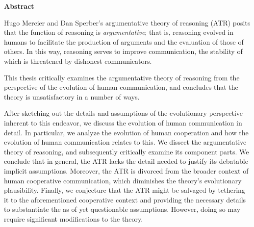 \thispagestyle{empty}
\begin{center}
    \large \textbf{Abstract}
\end{center}

\noindent Hugo Mercier and Dan Sperber's argumentative theory of reasoning (ATR) posits that the function of reasoning is \emph{argumentative}; that is, reasoning evolved in humans to facilitate the production of arguments and the evaluation of those of others. In this way, reasoning serves to improve communication, the stability of which is threatened by dishonest communicators.

This thesis critically examines the argumentative theory of reasoning
from the perspective of the evolution of human communication, and concludes that the theory is unsatisfactory in a number of ways.

After sketching out the details and assumptions of the evolutionary perspective inherent to this endeavor, we discuss the evolution of human communication in detail. In particular, we analyze the evolution of human cooperation and how the evolution of human communication relates to this.
We dissect the argumentative theory of reasoning, and subsequently critically examine its component parts.
We conclude that in general, the ATR lacks the detail needed to justify its debatable implicit assumptions. Moreover, the ATR is divorced from the broader context of human cooperative communication, which diminishes the theory's evolutionary plausibility.
Finally, we conjecture that the ATR might be salvaged by tethering it to the aforementioned cooperative context and providing the necessary details to substantiate the as of yet questionable assumptions. However, doing so may require significant modifications to the theory.
